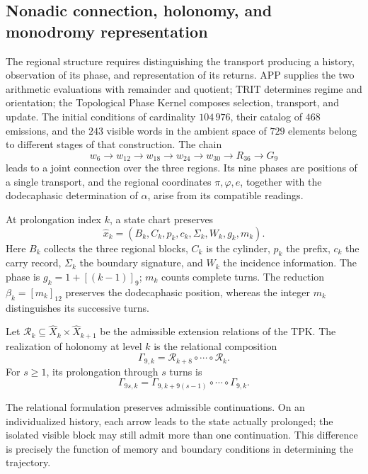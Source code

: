 \subsection{Nonadic connection, holonomy, and monodromy representation}
\label{mono-ampl:conexion}

The regional structure requires distinguishing the transport producing a
history, observation of its phase, and representation of its returns.
APP supplies the two arithmetic evaluations with remainder and quotient; TRIT
determines regime and orientation; the Topological Phase Kernel composes
selection, transport, and update. The initial conditions of
cardinality \(104\,976\), their catalog of \(468\) emissions, and the \(243\)
visible words in the ambient space of \(729\) elements belong to different
stages of that construction. The chain
\[
 w_6\longrightarrow w_{12}\longrightarrow w_{18}
 \longrightarrow w_{24}\longrightarrow w_{30}
 \longrightarrow R_{36}\longrightarrow G_9
\]
leads to a joint connection over the three regions. Its nine phases
are positions of a single transport, and the regional coordinates
\(\pi,\varphi,e\), together with the dodecaphasic determination of \(\alpha\),
arise from its compatible readings\cite{hmtintegral,hmtholonomia}.

At prolongation index \(k\), a state chart preserves
\[
 \widehat x_k=(B_k,C_k,p_k,c_k,\Sigma_k,W_k,g_k,m_k).
\]
Here \(B_k\) collects the three regional blocks, \(C_k\) is the cylinder,
\(p_k\) the prefix, \(c_k\) the carry record, \(\Sigma_k\) the boundary
signature, and \(W_k\) the incidence information. The phase is
\(g_k=1+[(k-1)]_9\); \(m_k\) counts complete turns. The reduction
\(\beta_k=[m_k]_{12}\) preserves the dodecaphasic position, whereas the
integer \(m_k\) distinguishes its successive turns.

\begin{definition}
\label{mono-ampl:def-vuelta}
Let \(\mathcal R_k\subseteq\widehat X_k\times\widehat X_{k+1}\)
be the admissible extension relations of the TPK. The realization of
holonomy at level \(k\) is the relational composition
\[
 \Gamma_{9,k}=\mathcal R_{k+8}\circ\cdots\circ\mathcal R_k.
\]
For \(s\geq1\), its prolongation through \(s\) turns is
\[
 \Gamma_{9s,k}=
 \Gamma_{9,k+9(s-1)}\circ\cdots\circ\Gamma_{9,k}.
\]
\end{definition}

The relational formulation preserves admissible continuations. On
an individualized history, each arrow leads to the state actually
prolonged; the isolated visible block may still admit more than one
continuation. This difference is precisely the function of memory and
boundary conditions in determining the trajectory.

